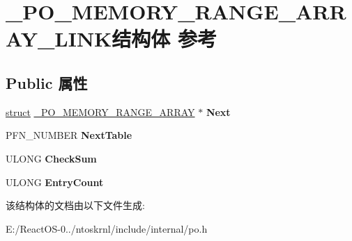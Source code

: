 \hypertarget{struct___p_o___m_e_m_o_r_y___r_a_n_g_e___a_r_r_a_y___l_i_n_k}{}\section{\+\_\+\+P\+O\+\_\+\+M\+E\+M\+O\+R\+Y\+\_\+\+R\+A\+N\+G\+E\+\_\+\+A\+R\+R\+A\+Y\+\_\+\+L\+I\+N\+K结构体 参考}
\label{struct___p_o___m_e_m_o_r_y___r_a_n_g_e___a_r_r_a_y___l_i_n_k}
\subsection*{Public 属性}
\begin{DoxyCompactItemize}
\item 
\mbox{\label{struct___p_o___m_e_m_o_r_y___r_a_n_g_e___a_r_r_a_y___l_i_n_k_a95489a567b5f399e71dd37c3c25799e5}} 
\hyperlink{interfacestruct}{struct} \hyperlink{struct___p_o___m_e_m_o_r_y___r_a_n_g_e___a_r_r_a_y}{\+\_\+\+P\+O\+\_\+\+M\+E\+M\+O\+R\+Y\+\_\+\+R\+A\+N\+G\+E\+\_\+\+A\+R\+R\+AY} $\ast$ {\bfseries Next}
\item 
\mbox{\label{struct___p_o___m_e_m_o_r_y___r_a_n_g_e___a_r_r_a_y___l_i_n_k_a55705311e2f44b2b791aaf8e8e0b1bee}} 
P\+F\+N\+\_\+\+N\+U\+M\+B\+ER {\bfseries Next\+Table}
\item 
\mbox{\label{struct___p_o___m_e_m_o_r_y___r_a_n_g_e___a_r_r_a_y___l_i_n_k_a93dfeebc712190e492b971afcb6ea9fc}} 
U\+L\+O\+NG {\bfseries Check\+Sum}
\item 
\mbox{\label{struct___p_o___m_e_m_o_r_y___r_a_n_g_e___a_r_r_a_y___l_i_n_k_a807d9913cade05c55c14e755ff60e5e8}} 
U\+L\+O\+NG {\bfseries Entry\+Count}
\end{DoxyCompactItemize}


该结构体的文档由以下文件生成\+:\begin{DoxyCompactItemize}
\item 
E\+:/\+React\+O\+S-\/0../ntoskrnl/include/internal/po.\+h\end{DoxyCompactItemize}
